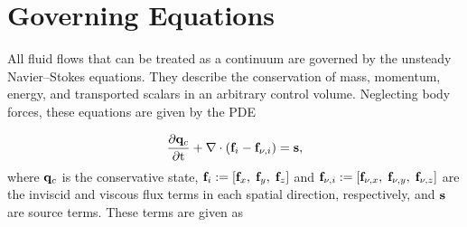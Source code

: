 \section{Governing Equations}\label{sec:govEqs}

All fluid flows that can be treated as a continuum are governed by the unsteady Navier--Stokes equations. They describe the conservation of mass, momentum, energy, and transported scalars in an arbitrary control volume. Neglecting body forces, these equations are given by the PDE

\begin{equation}\label{eq:gemsGovPDE}
    \frac{\partial \mathbf{q}_c}{\partial \text{t}} + \nabla \cdot (\mathbf{f}_{i} - \mathbf{f}_{\nu,i}) = \mathbf{s},
\end{equation}
where $\mathbf{q}_c$ is the conservative state, $\mathbf{f}_{i} := [\mathbf{f}_x, \; \mathbf{f}_y, \; \mathbf{f}_z]$ and $\mathbf{f}_{\nu,i} := [\mathbf{f}_{\nu,x}, \; \mathbf{f}_{\nu,y}, \; \mathbf{f}_{\nu,z}]$ are the inviscid and viscous flux terms in each spatial direction, respectively, and $\mathbf{s}$ are source terms. These terms are given as

